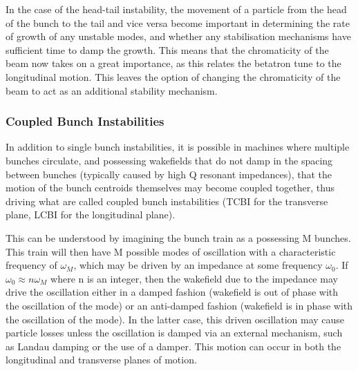 In the case of the head-tail instability, the movement of a particle from the head of the bunch to the tail and vice versa become important in determining the rate of growth of any unstable modes, and whether any stabilisation mechanisms have sufficient time to damp the growth. This means that the chromaticity of the beam now takes on a great importance, as this relates the betatron tune to the longitudinal motion. This leaves the option of changing the chromaticity of the beam to act as an additional stability mechanism.

\subsubsection{Coupled Bunch Instabilities}

In addition to single bunch instabilities, it is possible in machines where multiple bunches circulate, and possessing wakefields that do not damp in the spacing between bunches (typically caused by high Q resonant impedances), that the motion of the bunch centroids themselves may become coupled together, thus driving what are called coupled bunch instabilities (TCBI for the transverse plane, LCBI for the longitudinal plane). 

This can be understood by imagining the bunch train as a possessing M bunches. This train will then have M possible modes of oscillation with a characteristic frequency of $\omega_{M}$, which may be driven by an impedance at some frequency $\omega_{0}$. If $\omega_{0} \approx n\omega_{M}$ where n is an integer, then the wakefield due to the impedance may drive the oscillation either in a damped fashion (wakefield is out of phase with the oscillation of the mode) or an anti-damped fashion (wakefield is in phase with the oscillation of the mode). In the latter case, this driven oscillation may cause particle losses unless the oscillation is damped via an external mechanism, such as Landau damping or the use of a damper. This motion can occur in both the longitudinal and transverse planes of motion.


